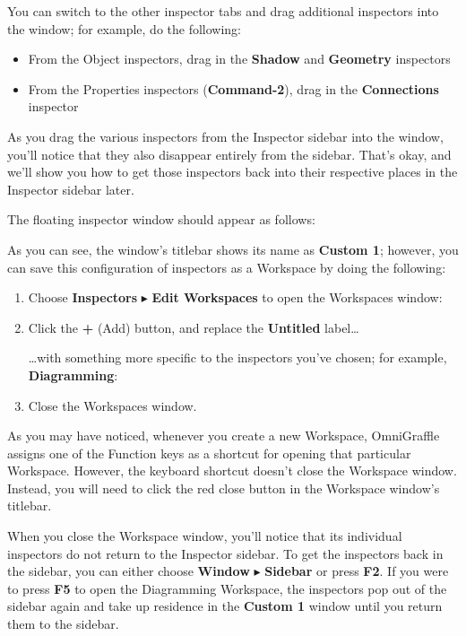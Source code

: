 \documentclass[../main.tex]{subfiles}
\begin{document}
You can switch to the other inspector tabs and drag additional inspectors into the window; for
example, do the following:

\begin{itemize}
  \item From the Object inspectors, drag in the \textbf{Shadow} and \textbf{Geometry} inspectors
  \item From the Properties inspectors (\textbf{Command-2}), drag in the \textbf{Connections}
    inspector
\end{itemize}

As you drag the various inspectors from the Inspector sidebar into the window, you'll notice
that they also disappear entirely from the sidebar. That's okay, and we'll show you how to get
those inspectors back into their respective places in the Inspector sidebar later.

The floating inspector window should appear as follows:


As you can see, the window's titlebar shows its name as \textbf{Custom 1}; however, you can save
this configuration of inspectors as a Workspace by doing the following:

\begin{enumerate}
  \item Choose \textbf{Inspectors} $\blacktriangleright$ \textbf{Edit Workspaces} to open the
    Workspaces window:

  \item Click the \textbf{+} (Add) button, and replace the \textbf{Untitled} label\ldots{}


    \ldots{}with something more specific to the inspectors you've chosen; for example,
    \textbf{Diagramming}:

  \item Close the Workspaces window.
\end{enumerate}

As you may have noticed, whenever you create a new Workspace, OmniGraffle assigns one of the
Function keys as a shortcut for opening that particular Workspace. However, the keyboard
shortcut doesn't close the Workspace window. Instead, you will need to click the red close
button in the Workspace window's titlebar.

When you close the Workspace window, you'll notice that its individual inspectors do not return
to the Inspector sidebar. To get the inspectors back in the sidebar, you can either choose
\textbf{Window} $\blacktriangleright$ \textbf{Sidebar} or press \textbf{F2}. If you were to
press \textbf{F5} to open the Diagramming Workspace, the inspectors pop out of the sidebar
again and take up residence in the \textbf{Custom 1} window until you return them to the
sidebar.
\end{document}
